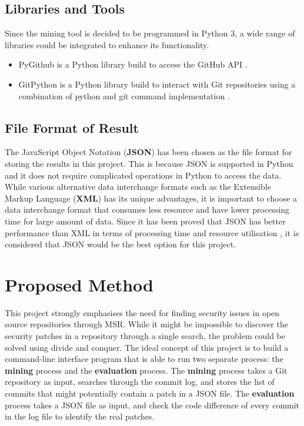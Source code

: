 \documentclass[12pt, a4paper]{report}
\begin{document}
{\subsection{Libraries and Tools}
Since the mining tool is decided to be programmed in Python 3, a wide range of libraries could be
integrated to enhance its functionality.
\begin{itemize}
	\item PyGithub is a Python library build to access the GitHub API \cite{pygithub}.
	\item GitPython is a Python library build to interact with Git repositories using a combination of
	python and git command implementation \cite{gitpython}.
\end{itemize}

\subsection{File Format of Result}
The JavaScript Object Notation (\textbf{JSON}) \cite{json} has been chosen as the file format for
storing the results in this project. This is because JSON is supported in Python and it does not
require complicated operations in Python to access the data. While various alternative data
interchange formats such as the Extensible Markup Language (\textbf{XML}) \cite{xml} has its unique
advantages, it is important to choose a data interchange format that consumes less resource and have
lower processing time for large amount of data. Since it has been proved that JSON has better
performance than XML in terms of processing time and resource utilisation \cite{nurseitov_2009}, it
is considered that JSON would be the best option for this project.

\section{Proposed Method}
This project strongly emphasises the need for finding security issues in open source repositories
through MSR. While it might be impossible to discover the security patches in a repository through a
single search, the problem could be solved using divide and conquer. The ideal concept of this
project is to build a command-line interface program that is able to run two separate process: the
\textbf{mining} process and the \textbf{evaluation} process. The \textbf{mining} process takes a Git
repository as input, searches through the commit log, and stores the list of commits that might
potentially contain a patch in a JSON file. The \textbf{evaluation} process takes a JSON file as
input, and check the code difference of every commit in the log file to identify the real patches.

}
\end{document}
